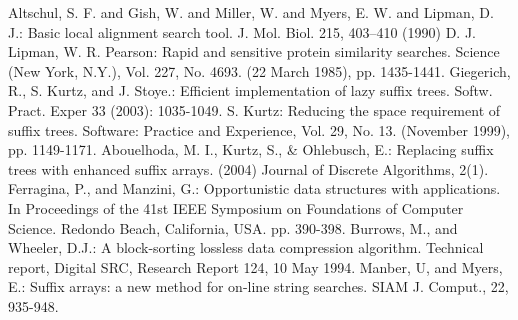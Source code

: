 \documentclass[runningheads,a4paper]{llncs}
\begin{document}
\begin{thebibliography}{8}
   Altschul, S. F. and Gish, W. and Miller, W. and Myers, E. W. and Lipman, D. J.: Basic local alignment search tool. J. Mol. Biol. 215, 403--410 (1990)
   D. J. Lipman, W. R. Pearson: Rapid and sensitive protein similarity searches. Science (New York, N.Y.), Vol. 227, No. 4693. (22 March 1985), pp. 1435-1441.
   Giegerich, R., S. Kurtz, and J. Stoye.: Efficient implementation of lazy suffix trees. Softw. Pract. Exper 33 (2003): 1035-1049.
   S. Kurtz: Reducing the space requirement of suffix trees. Software: Practice and Experience, Vol. 29, No. 13. (November 1999), pp. 1149-1171.
   Abouelhoda, M. I., Kurtz, S., \& Ohlebusch, E.: Replacing suffix trees with enhanced suffix arrays. (2004) Journal of Discrete Algorithms, 2(1).
   Ferragina, P., and Manzini, G.: Opportunistic data structures with applications. In Proceedings of the 41st IEEE Symposium on Foundations of Computer Science. Redondo Beach, California, USA. pp. 390-398.
   Burrows, M., and Wheeler, D.J.: A block-sorting lossless data compression algorithm. Technical report, Digital SRC, Research Report 124, 10 May 1994.
   Manber, U, and Myers, E.: Suffix arrays: a new method for on-line string searches. SIAM J. Comput., 22, 935-948.
\end{thebibliography}
\end{document}
